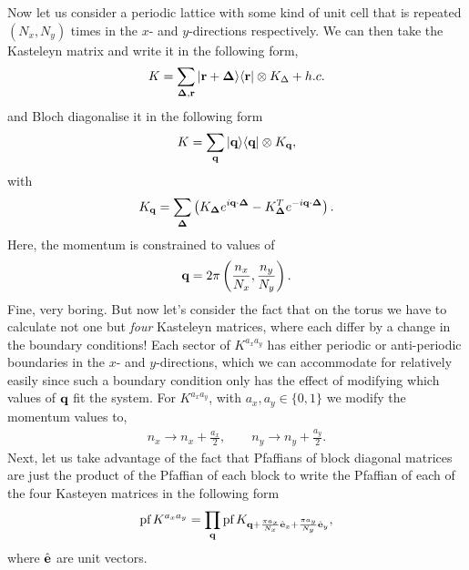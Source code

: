 \documentclass[11pt, oneside]{article} %
\numberwithin{equation}{section}
\begin{document}
Now let us consider a periodic lattice with some kind of unit cell that is repeated $ (N_x, N_y)$ times in the $x$- and $y$-directions respectively. We can then take the Kasteleyn matrix and write it in the following form,
\begin{align}
    K = \sum_{\bm \Delta , \textbf r} \ket{\textbf r +\bm \Delta}\!\bra{\textbf r} \otimes K_{\Delta}  + h.c.
\end{align}
and Bloch diagonalise it in the following form 
\begin{align}
    K = \sum_{\textbf q}\ket{\textbf q}\!\bra{\textbf q} \otimes K_{\textbf q},
\end{align}
with 
\begin{align}
     K_{\textbf q} = \sum_{\bm \Delta}\left (
        K_{\bm\Delta} 
        e^{i\textbf q \cdot \bm \Delta} 
        - 
        K_{\bm \Delta}^T 
        e^{-i\textbf q \cdot \bm \Delta} 
        \right ).
\end{align}
Here, the momentum is constrained to values of 
\begin{align}
    \textbf q = 2\pi \left ( \frac{n_x}{N_x}, \frac{n_y}{N_y} \right ).
\end{align}
Fine, very boring. But now let's consider the fact that on the torus we have to calculate not one but \textit{four} Kasteleyn matrices, where each differ by a change in the boundary conditions! Each sector of $K^{a_x a_y}$ has either periodic or anti-periodic boundaries in the $x$- and $y$-directions, which we can accommodate for relatively easily since such a boundary condition only has the effect of modifying which values of $\textbf q$ fit the system. For $K^{a_x a_y}$, with $a_x, a_y\in \{0,1\}$ we modify the momentum values to,
\begin{align}
    n_x \rightarrow n_x + \frac {a_x}2, \qquad
    n_y  \rightarrow n_y + \frac {a_y}2.
\end{align}
Next, let us take advantage of the fact that Pfaffians of block diagonal matrices are just the product of the Pfaffian of each block to write the Pfaffian of each of the four Kasteyen matrices in the following form
\begin{align}
    \textup{pf}\, K^{a_x a_y} = \prod_{\textbf q} \textup{pf}\, K_{\textbf q + 
    \frac{\pi a_x}{N_x}\hat {\textbf e}_x +
    \frac{\pi a_y}{N_y}\hat {\textbf e}_y
    },
\end{align}
where $\hat {\textbf e}$ are unit vectors.
\end{document}
